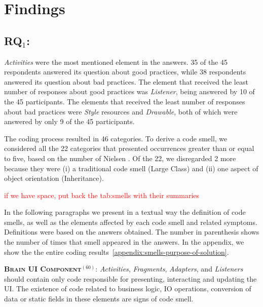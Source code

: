 \section{Findings}

\subsection{RQ$_1$: \rqone}
\label{phase1-results}

\textit{Activities} were the most mentioned element in the answers. 35 of the 45 respondents answered its question about good practices, while 38 respondents answered its question about bad practices.
The element that received the least number of responses about good practices was \textit{Listener}, being answered by 10 of the 45 participants. The elements that received the least number of responses about bad practices were \textit{Style} resources and \textit{Drawable}, both of which were answered by only 9 of the 45 participants. 

The coding process resulted in 46 categories. To derive a code smell, we considered 
all the 22 categories that presented occurrences greater than or equal to five, based on the number of Nielsen \cite{NielsenMagicNumber:00}.
Of the 22, we disregarded 2 more because they were (i) a traditional code smell (Large Class) and (ii) one aspect of object orientation (Inheritance). 

\textcolor{red}{if we have space, put back the tab:smells with their summaries}

In the following paragraphs we present in a textual way the definition of code smells, as well as the elements affected by each code smell and related symptoms. 
Definitions were based on the answers obtained. 
The number in parenthesis shows the number of times that smell appeared in the answers.
In the appendix, we show the the entire coding results~\ref{appendix:smells-purpose-of-solution}.


\noindent
\textsc{\textbf{{\small Brain UI Component}}}$^{(60)}$: \textit{Activities}, \textit{Fragments}, \textit{Adapters}, and \textit{Listeners} should contain only code responsible for presenting, interacting and updating the UI. The existence of code related to business logic, IO operations, conversion of data or static fields in these elements are signs of code smell.


